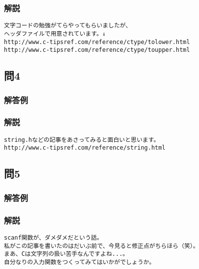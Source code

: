 \subsubsection{解説}
\begin{verbatim}
文字コードの勉強がてらやってもらいましたが、
ヘッダファイルで用意されています。↓
http://www.c-tipsref.com/reference/ctype/tolower.html
http://www.c-tipsref.com/reference/ctype/toupper.html
\end{verbatim}

\subsection{問4}
\subsubsection{解答例}

\subsubsection{解説}
\begin{verbatim}
string.hなどの記事をあさってみると面白いと思います。
http://www.c-tipsref.com/reference/string.html
\end{verbatim}

\subsection{問5}
\subsubsection{解答例}

\subsubsection{解説}
\begin{verbatim}
scanf関数が、ダメダメだという話。
私がこの記事を書いたのはだいぶ前で、今見ると修正点がちらほら（笑）。
まあ、Cは文字列の扱い苦手なんですよね...。
自分なりの入力関数をつくってみてはいかがでしょうか。

\end{verbatim}
